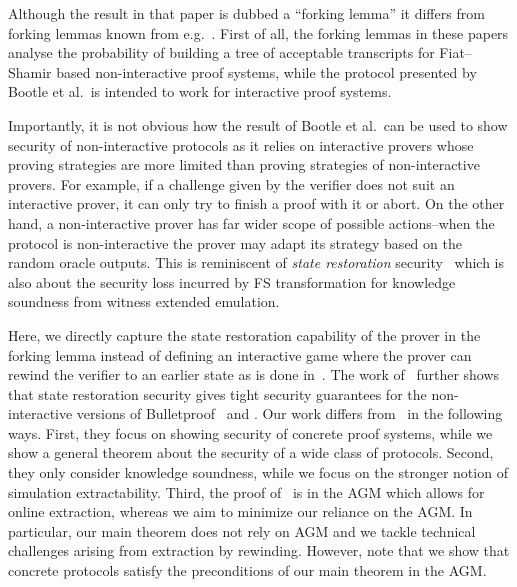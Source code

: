 Although the result in that paper is dubbed a ``forking lemma'' it
differs from forking lemmas known from e.g.~\cite{JC:PoiSte00,CCS:BelNev06}.
First of all, the forking lemmas in these papers analyse the probability of building
a tree of acceptable transcripts for Fiat--Shamir based non-interactive proof
systems, while the protocol presented by Bootle et al.~is intended to work for
interactive proof systems.

Importantly, it is not obvious how the result of Bootle et al.~can be used to
show security of non-interactive protocols as it relies on interactive provers
whose proving strategies are more limited than proving strategies of
non-interactive provers. For example, if a challenge given by the verifier does not
suit an interactive prover, it can only try to finish a proof with it or
abort. On the other hand, a non-interactive prover has far wider scope of
possible actions--when the protocol is non-interactive the prover may
adapt its strategy based on the random oracle outputs. 
This is reminiscent of \emph{state restoration} security~\cite{TCC:BenChiSpo16,EPRINT:Holmgren19} which is also about the security loss incurred by FS transformation for knowledge soundness from witness extended emulation.

Here, we directly capture the state restoration capability of the prover in the forking lemma instead of defining an interactive game where the prover can rewind the verifier to an earlier state as is done in~\cite{C:GhoTes21}. 
The work of~\cite{C:GhoTes21} further shows that state restoration security gives tight security guarantees for the
non-interactive versions of Bulletproof~\cite{SP:BBBPWM18} and \sonic. 
Our work differs from~\cite{C:GhoTes21} in the following ways. First, they
focus on showing security of concrete proof systems, while we show
a general theorem about the security of a wide class of protocols. 
Second, they only consider knowledge soundness, while we focus on the stronger notion of simulation extractability. Third, the proof of~\cite{C:GhoTes21} is in the AGM which allows for online extraction, whereas we aim to minimize our reliance on the AGM. In particular, our main theorem does not rely on AGM and we tackle technical challenges arising from extraction by rewinding. 
However, note that we show that concrete protocols satisfy the preconditions of our main theorem in the AGM.

